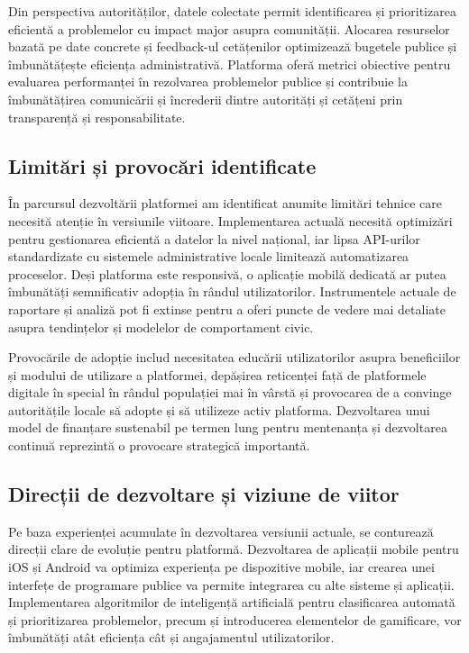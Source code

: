 \documentclass[12pt,a4paper]{report}
\begin{document}
Din perspectiva autorităților, datele colectate permit identificarea și prioritizarea eficientă a problemelor cu impact major asupra comunității. Alocarea resurselor bazată pe date concrete și feedback-ul cetățenilor optimizează bugetele publice și îmbunătățește eficiența administrativă. Platforma oferă metrici obiective pentru evaluarea performanței în rezolvarea problemelor publice și contribuie la îmbunătățirea comunicării și încrederii dintre autorități și cetățeni prin transparență și responsabilitate.

\subsection{Limitări și provocări identificate}

În parcursul dezvoltării platformei am  identificat anumite limitări tehnice care necesită atenție în versiunile viitoare. Implementarea actuală necesită optimizări pentru gestionarea eficientă a datelor la nivel național, iar lipsa API-urilor standardizate cu sistemele administrative locale limitează automatizarea proceselor. Deși platforma este responsivă, o aplicație mobilă dedicată ar putea îmbunătăți semnificativ adopția în rândul utilizatorilor. Instrumentele actuale de raportare și analiză pot fi extinse pentru a oferi puncte de vedere  mai detaliate asupra tendințelor și modelelor de comportament civic.

Provocările de adopție includ necesitatea educării utilizatorilor asupra beneficiilor și modului de utilizare a platformei, depășirea reticenței față de platformele digitale în special în rândul populației mai în vârstă  și provocarea de a convinge autoritățile locale să adopte și să utilizeze activ platforma. Dezvoltarea unui model de finanțare sustenabil pe termen lung pentru mentenanța și dezvoltarea continuă reprezintă o provocare strategică importantă.

\subsection{Direcții de dezvoltare și viziune de viitor}

Pe baza experienței acumulate în dezvoltarea versiunii actuale, se conturează direcții clare de evoluție pentru platformă. Dezvoltarea de aplicații mobile  pentru iOS și Android va optimiza experiența pe dispozitive mobile, iar crearea unei interfețe de programare publice va permite integrarea cu alte sisteme și aplicații. Implementarea algoritmilor de inteligență artificială pentru clasificarea automată și prioritizarea problemelor, precum și introducerea elementelor de gamificare, vor îmbunătăți atât eficiența cât și angajamentul utilizatorilor.
\end{document}
